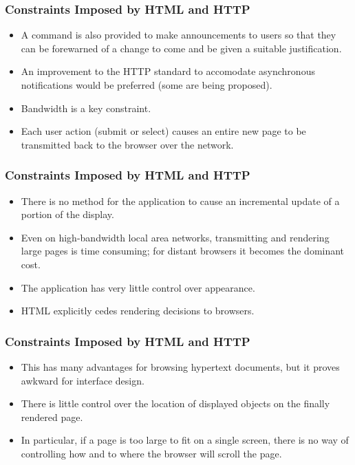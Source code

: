 \documentclass{beamer}
\begin{document}
\begin{frame}
\frametitle{Constraints Imposed by HTML and HTTP}

\begin{itemize}
\item A command is also provided to make announcements to users so that they can be forewarned of a change to come and be given a suitable justification.
\item An improvement to the HTTP standard to accomodate asynchronous notifications would be preferred (some are being proposed).
\item Bandwidth is a key constraint.
\item Each user action (submit or select) causes an entire new page to be transmitted back to the browser over the network.
\end{itemize}

\end{frame}

\begin{frame}
\frametitle{Constraints Imposed by HTML and HTTP}

\begin{itemize}
\item There is no method for the application to cause an incremental update of a portion of the display.
\item Even on high-bandwidth local area networks, transmitting and rendering large pages is time consuming; for distant browsers it becomes the dominant cost.
\item The application has very little control over appearance.
\item HTML explicitly cedes rendering decisions to browsers.
\end{itemize}

\end{frame}

\begin{frame}
\frametitle{Constraints Imposed by HTML and HTTP}

\begin{itemize}
\item This has many advantages for browsing hypertext documents, but it proves awkward for interface design.
\item There is little control over the location of displayed objects on the finally rendered page.
\item In particular, if a page is too large to fit on a single screen, there is no way of controlling how and to where the browser will scroll the page.
\end{itemize}

\end{frame}
\end{document}
